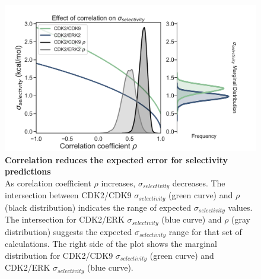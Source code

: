 \documentclass[9pt,lineno]{elife-modified} %
\begin{document}
\begin{figure}[h]
\begin{fullwidth}
\begin{centering}
\includegraphics[width=1.0\linewidth]{figures/supp_figure3.pdf}
\end{centering}
\caption{
\label{fig:sup-figure-3}
{\bf Correlation reduces the expected error for selectivity predictions} \\
As corelation coefficient $\rho$ increases, $\sigma_{selectivity}$ decreases. The intersection between CDK2/CDK9 $\sigma_{selectivity}$ (green curve) and $\rho$ (black distribution) indicates the range of expected $\sigma_{selectivity}$ values. The intersection for CDK2/ERK $\sigma_{selectivity}$ (blue curve) and $\rho$ (gray distribution) suggests the expected $\sigma_{selectivity}$ range for that set of calculations. The right side of the plot shows the marginal distribution for CDK2/CDK9 $\sigma_{selectivity}$ (green curve) and CDK2/ERK $\sigma_{selectivity}$ (blue curve). 
}
\end{fullwidth}
\end{figure}
\end{document}
